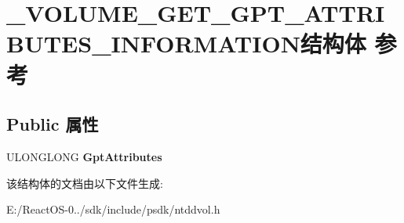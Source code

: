 \hypertarget{struct___v_o_l_u_m_e___g_e_t___g_p_t___a_t_t_r_i_b_u_t_e_s___i_n_f_o_r_m_a_t_i_o_n}{}\section{\+\_\+\+V\+O\+L\+U\+M\+E\+\_\+\+G\+E\+T\+\_\+\+G\+P\+T\+\_\+\+A\+T\+T\+R\+I\+B\+U\+T\+E\+S\+\_\+\+I\+N\+F\+O\+R\+M\+A\+T\+I\+O\+N结构体 参考}
\label{struct___v_o_l_u_m_e___g_e_t___g_p_t___a_t_t_r_i_b_u_t_e_s___i_n_f_o_r_m_a_t_i_o_n}
\subsection*{Public 属性}
\begin{DoxyCompactItemize}
\item 
\mbox{\label{struct___v_o_l_u_m_e___g_e_t___g_p_t___a_t_t_r_i_b_u_t_e_s___i_n_f_o_r_m_a_t_i_o_n_a4302eebfdef7273dcbe3c8da3631edc5}} 
U\+L\+O\+N\+G\+L\+O\+NG {\bfseries Gpt\+Attributes}
\end{DoxyCompactItemize}


该结构体的文档由以下文件生成\+:\begin{DoxyCompactItemize}
\item 
E\+:/\+React\+O\+S-\/0../sdk/include/psdk/ntddvol.\+h\end{DoxyCompactItemize}

